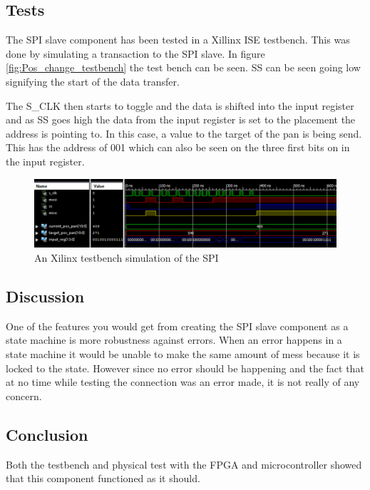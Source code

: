 \subsection{Tests}

The SPI slave component has been tested in a Xillinx ISE testbench. This was done by simulating a transaction to the SPI slave. In figure \ref{fig:Pos_change_testbench} the test bench can be seen. SS can be seen going low signifying the start of the data transfer.

\newpage

The S\_CLK then starts to toggle and the data is shifted into the input register and as SS goes high the data from the input register is set to the placement the address is pointing to. In this case, a value to the target of the pan is being send. This has the address of 001 which can also be seen on the three first bits on in the input register.

\begin{figure}[h!]
\centering
\includegraphics[scale=0.5]{Billeder/FPGA/SPI_Slave/Testbench_of_SPI.png}
\caption{ An Xilinx testbench simulation of the SPI }
\label{fig:Testbench_of_SPI}
\end{figure}

\newpage

\subsection{Discussion}

One of the features you would get from creating the SPI slave component as a state machine is more robustness against errors. When an error happens in a state machine it would be unable to make the same amount of mess because it is locked to the state. However since no error should be happening and the fact that at no time while testing the connection was an error made, it is not really of any concern.

\subsection{Conclusion}

Both the testbench and physical test with the FPGA and microcontroller showed that this component functioned as it should.
